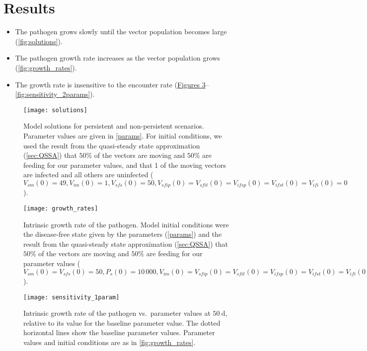 \documentclass{article}
\begin{document}
\section{Results}

\begin{itemize}
\item The pathogen grows slowly until the vector population becomes
  large (\autoref{fig:solutions}).

\item The pathogen growth rate increases as the vector population
  grows (\autoref{fig:growth_rates}).

\item The growth rate is insensitive to the encounter rate
  (\hyperref[fig:sensitivity_1param]{Figures
    \ref*{fig:sensitivity_1param}}--\ref{fig:sensitivity_2params}).
\end{itemize}


\begin{figure}
  \centering
  \texttt{[image: solutions]}
  \caption{Model solutions for persistent and non-persistent
    scenarios.  Parameter values are given in \autoref{params}.
    For initial conditions, we used the result from the quasi-steady
    state approximation (\autoref{sec:QSSA}) that $50\%$ of the
    vectors are moving and $50\%$ are feeding for our parameter
    values, and that 1 of the moving vectors are infected and all
    others are uninfected ($V_{sm}(0) = 49, V_{im}(0) = 1, V_{sfs}(0) =
    50, V_{sfip}(0) = V_{sfit}(0) = V_{ifsp}(0) = V_{ifst}(0) =
    V_{ifi}(0) = 0$).}
  \label{fig:solutions}
\end{figure}

\begin{figure}
  \centering
  \texttt{[image: growth\_rates]}
  \caption{Intrinsic growth rate of the pathogen.  Model initial
    conditions were the disease-free state given by the parameters
    (\autoref{params}) and the result from the quasi-steady state
    approximation (\autoref{sec:QSSA}) that $50\%$ of the vectors are
    moving and $50\%$ are feeding for our parameter values ($V_{sm}(0)
    = V_{sfs}(0) = 50, P_s(0) = 10\,000, V_{im}(0) = V_{sfip}(0) =
    V_{sfit}(0) = V_{ifsp}(0) = V_{ifst}(0) = V_{ifi}(0) = P_i(0) =
    0$).}
  \label{fig:growth_rates}
\end{figure}

\begin{figure}
  \centering
  \texttt{[image: sensitivity\_1param]}
  \caption{Intrinsic growth rate of the pathogen vs.~parameter values
    at $50~\text{d}$, relative to its value for the baseline
    parameter value.  The dotted horizontal lines show the baseline
    parameter values.  Parameter values and initial conditions are as
    in \autoref{fig:growth_rates}.}
  \label{fig:sensitivity_1param}
\end{figure}
\end{document}
